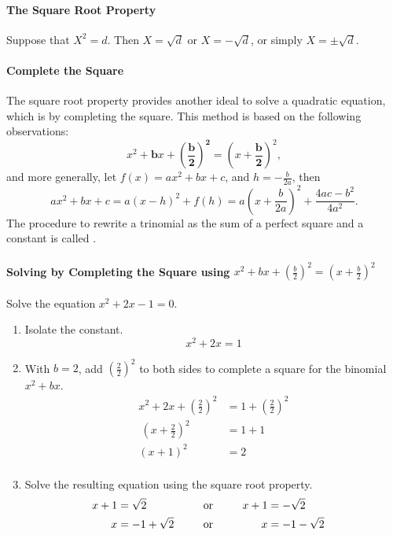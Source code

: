 

\paragraph*{The Square Root Property}
	Suppose that $X^2=d$. Then $X=\sqrt{d}$ or $X=-\sqrt{d}$, or simply $X=\pm\sqrt{d}$.

\paragraph*{Complete the Square}The square root property provides another ideal to solve a quadratic equation, which is by completing the square. This method is based on the following observations:
	\[
		x^2+{\boldsymbol{b}}x+{\boldsymbol{\left(\frac b2\right)^2}}=\left(x+{\boldsymbol{\frac b2}}\right)^2,
	\]
	and more generally, let $f(x)=ax^2+bx+c$, and $h=-\frac{b}{2a}$, then
	\[
	ax^2+bx+c=a(x-h)^2+f(h)=a\left(x+\frac{b}{2a}\right)^2+\frac{4ac-b^2}{4a^2}.
	\]
	The procedure to rewrite a trinomial as the sum of a perfect square and a constant is called .


\paragraph*{Solving by Completing the Square using $x^2+{b}x+{\left(\frac b2\right)^2}=\left(x+{\frac b2}\right)^2$}
\mbox{}
	\begin{example}
		Solve the equation $x^2+2x-1=0$.
	\end{example}
	\begin{solution}\mbox{}
		\vspace{-0.25em}
		\begin{enumerate}[label={\textbf{\textup{Step \arabic*.}}~}]
			\item Isolate the constant.
			      \[x^2+2x=1\]
			\item With $b=2$, add $\left(\frac 22\right)^2$ to both sides to complete a square for the binomial $x^2+bx$.
			      \[
				      \begin{split}
					      x^2+2x+\left(\frac22\right)^2&=1+\left(\frac22\right)^2\\\
					      \left(x+\frac22\right)^2&=1+1\\
					      (x+1)^2&=2\\
				      \end{split}
			      \]
			\item Solve the resulting equation using the square root property.
			      \begin{alignat*}{3}
				      x+1 & =\sqrt2    &  & \ctc{or} & x+1 & =-\sqrt2   \\
				      x   & =-1+\sqrt2 &  & \ctc{or} & x   & =-1-\sqrt2
			      \end{alignat*}
		\end{enumerate}
	\end{solution}


